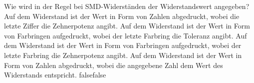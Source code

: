     {Wie wird in der Regel bei SMD-Widerständen der Widerstandswert angegeben?}
    {Auf dem Widerstand ist der Wert in Form von Zahlen abgedruckt, wobei die letzte Ziffer die Zehnerpotenz angibt.}
    {Auf dem Widerstand ist der Wert in Form von Farbringen aufgedruckt, wobei der letzte Farbring die Toleranz angibt.}
    {Auf dem Widerstand ist der Wert in Form von Farbringen aufgedruckt, wobei der letzte Farbring die Zehnerpotenz angibt.}
    {Auf dem Widerstand ist der Wert in Form von Zahlen abgedruckt, wobei die angegebene Zahl dem Wert des Widerstands entspricht.}
    {false}{false}